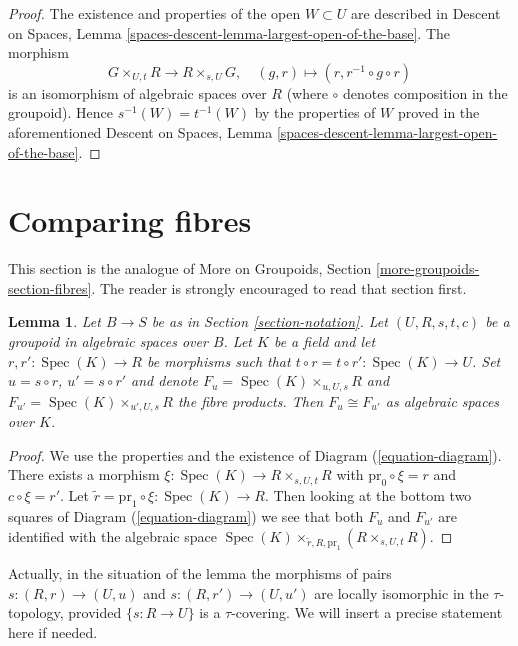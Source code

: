\documentclass{stacks-project}
\theoremstyle{plain}
\newtheorem{lemma}[subsection]{Lemma}
\theoremstyle{definition}
\theoremstyle{remark}
\numberwithin{equation}{subsection}
\def\Spec{\mathop{\mathrm{Spec}}}
\begin{document}
\begin{proof}
The existence and properties of the open $W \subset U$ are described in
Descent on Spaces, Lemma \ref{spaces-descent-lemma-largest-open-of-the-base}.
The morphism
$$
G \times_{U, t} R \longrightarrow R \times_{s, U} G, \quad
(g, r) \longmapsto (r, r^{-1} \circ g \circ r)
$$
is an isomorphism of algebraic spaces over $R$ (where $\circ$ denotes
composition in the groupoid). Hence $s^{-1}(W) = t^{-1}(W)$ by the
properties of $W$ proved in the aforementioned
Descent on Spaces, Lemma \ref{spaces-descent-lemma-largest-open-of-the-base}.
\end{proof}




\section{Comparing fibres}
\label{section-fibres}

\noindent
This section is the analogue of
More on Groupoids, Section \ref{more-groupoids-section-fibres}.
The reader is strongly encouraged to read that section first.

\begin{lemma}
\label{lemma-two-fibres}
Let $B \to S$ be as in Section \ref{section-notation}.
Let $(U, R, s, t, c)$ be a groupoid in algebraic spaces over $B$.
Let $K$ be a field and let $r, r' : \Spec(K) \to R$
be morphisms such that $t \circ r = t \circ r' : \Spec(K) \to U$.
Set $u = s \circ r$, $u' = s \circ r'$ and denote
$F_u = \Spec(K) \times_{u, U, s} R$ and
$F_{u'} = \Spec(K) \times_{u', U, s} R$ the fibre products.
Then $F_u \cong F_{u'}$ as algebraic spaces over $K$.
\end{lemma}

\begin{proof}
We use the properties and the existence of
Diagram (\ref{equation-diagram}).
There exists a morphism $\xi : \Spec(K) \to R \times_{s, U, t} R$
with $\text{pr}_0 \circ \xi = r$ and $c \circ \xi = r'$.
Let $\tilde r = \text{pr}_1 \circ \xi : \Spec(K) \to R$.
Then looking at the bottom two squares of
Diagram (\ref{equation-diagram})
we see that both $F_u$ and $F_{u'}$ are identified with the algebraic space
$\Spec(K) \times_{\tilde r, R, \text{pr}_1} (R \times_{s, U, t} R)$.
\end{proof}

\noindent
Actually, in the situation of the lemma the morphisms of pairs
$s : (R, r) \to (U, u)$ and $s : (R, r') \to (U, u')$ are
locally isomorphic in the $\tau$-topology, provided $\{s: R \to U\}$ is a
$\tau$-covering. We will insert a precise statement here if needed.
\end{document}
